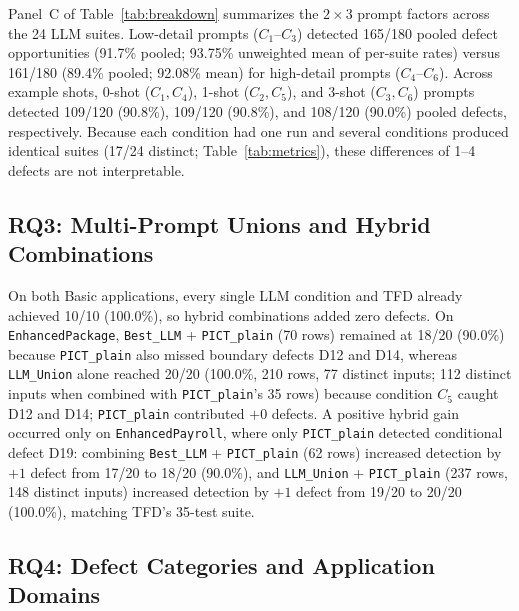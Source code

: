 \documentclass[acmsmall]{acmart}
\begin{document}
Panel~C of Table~\ref{tab:breakdown} summarizes the $2 \times 3$ prompt factors across the 24 LLM suites. Low-detail prompts ($C_1$--$C_3$) detected 165/180 pooled defect opportunities (91.7\% pooled; 93.75\% unweighted mean of per-suite rates) versus 161/180 (89.4\% pooled; 92.08\% mean) for high-detail prompts ($C_4$--$C_6$). Across example shots, 0-shot ($C_1, C_4$), 1-shot ($C_2, C_5$), and 3-shot ($C_3, C_6$) prompts detected 109/120 (90.8\%), 109/120 (90.8\%), and 108/120 (90.0\%) pooled defects, respectively. Because each condition had one run and several conditions produced identical suites (17/24 distinct; Table~\ref{tab:metrics}), these differences of 1--4 defects are not interpretable.

\subsection{RQ3: Multi-Prompt Unions and Hybrid Combinations}
\label{sec:rq3}

On both Basic applications, every single LLM condition and TFD already achieved 10/10 (100.0\%), so hybrid combinations added zero defects. On \texttt{EnhancedPackage}, \texttt{Best\_LLM} + \texttt{PICT\_plain} (70 rows) remained at 18/20 (90.0\%) because \texttt{PICT\_plain} also missed boundary defects D12 and D14, whereas \texttt{LLM\_Union} alone reached 20/20 (100.0\%, 210 rows, 77 distinct inputs; 112 distinct inputs when combined with \texttt{PICT\_plain}'s 35 rows) because condition $C_5$ caught D12 and D14; \texttt{PICT\_plain} contributed $+0$ defects. A positive hybrid gain occurred only on \texttt{EnhancedPayroll}, where only \texttt{PICT\_plain} detected conditional defect D19: combining \texttt{Best\_LLM} + \texttt{PICT\_plain} (62 rows) increased detection by $+1$ defect from 17/20 to 18/20 (90.0\%), and \texttt{LLM\_Union} + \texttt{PICT\_plain} (237 rows, 148 distinct inputs) increased detection by $+1$ defect from 19/20 to 20/20 (100.0\%), matching TFD's 35-test suite.

\subsection{RQ4: Defect Categories and Application Domains}
\label{sec:rq4}
\end{document}
